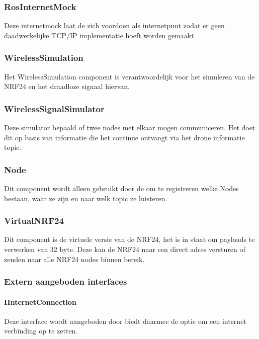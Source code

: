 \documentclass[a4paper, 11pt, oneside]{report}
\begin{document}
\subsubsection{RosInternetMock}
\label{architectural:subcomponenten:RosInternetMock}
Deze internetmock laat de  zich voordoen als internetpunt zodat er geen daadwerkelijke TCP/IP implementatie hoeft worden gemaakt 
\subsubsection{WirelessSimulation}
\label{architectural:subcomponenten:WirelessSimulation}
Het WirelessSimulation component is verantwoordelijk voor het simuleren van de NRF24 en het draadloze signaal hiervan. 
\subsubsection{WirelessSignalSimulator}
\label{architectural:subcomponenten:WirelessSignalSimulator}
Deze simulator bepaald of twee nodes met elkaar mogen communiceren. Het doet dit op basis van informatie die het continue ontvangt via het drone informatie topic. 
\subsubsection{Node}
\label{architectural:subcomponenten:Node}
Dit component wordt alleen gebruikt door de  om te registreren welke Nodes bestaan, waar ze zijn en naar welk topic ze luisteren.
\subsubsection{VirtualNRF24}
\label{architectural:subcomponenten:VirtualNRF24}
Dit component is de virtuele versie van de NRF24, het is in staat om payloads te verwerken van 32 byte.
Deze kan de NRF24 naar een direct adres versturen of zenden naar alle NRF24 nodes binnen bereik.

\subsubsection{Extern aangeboden interfaces}
\label{DetailedDesign:ros:extern:interfaces}

\paragraph{IInternetConnection}
\label{DetailedDesign:ros:extern:interfaces:IInternetConnection}
Deze interface wordt aangeboden door  biedt daarmee de optie om een internet verbinding op te zetten. 
 
\end{document}
